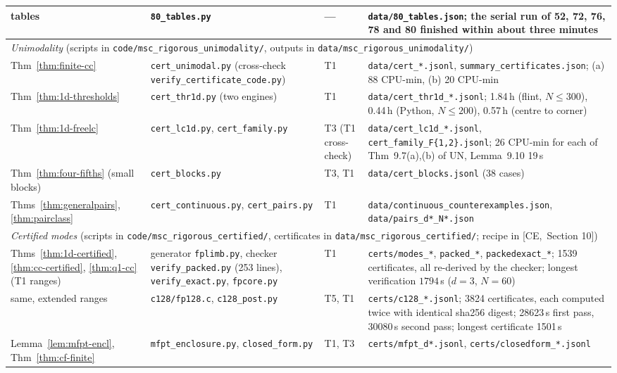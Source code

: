 \documentclass[10pt,a4paper]{article}
\theoremstyle{plain}
\theoremstyle{definition}
\newcommand{\src}[2]{[\textsf{#1},~#2]}           %
\newcommand{\UNI}{\textsf{UN}}
\newcommand{\CER}{\textsf{CE}}
\begin{document}
\begin{center}
\begin{longtable}{p{}p{}p{}p{}}
tables & \texttt{80\_tables.py} & --- & \texttt{data/80\_tables.json}; the serial run of 52, 72, 76, 78 and 80 finished within about three minutes\\
\midrule
\multicolumn{4}{p{0.9\textwidth}}{\emph{Unimodality} (scripts in \texttt{code/msc\_rigorous\_unimodality/}, outputs in \texttt{data/msc\_rigorous\_unimodality/})}\\
Thm~\ref{thm:finite-cc} & \texttt{cert\_unimodal.py} (cross-check \texttt{verify\_certificate\_code.py}) & T1 & \texttt{data/cert\_*.jsonl}, \texttt{summary\_certificates.json}; (a) 88 CPU-min, (b) 20 CPU-min\\
Thm~\ref{thm:1d-thresholds} & \texttt{cert\_thr1d.py} (two engines) & T1 & \texttt{data/cert\_thr1d\_*.jsonl}; 1.84\,h (flint, $N\le300$), 0.44\,h (Python, $N\le200$), 0.57\,h (centre to corner)\\
Thm~\ref{thm:1d-freelc} & \texttt{cert\_lc1d.py}, \texttt{cert\_family.py} & T3 (T1 cross-check) & \texttt{data/cert\_lc1d\_*.jsonl}, \texttt{cert\_family\_F\{1,2\}.jsonl}; 26 CPU-min for each of Thm~9.7(a),(b) of \UNI, Lemma~9.10 19\,s\\
Thm~\ref{thm:four-fifths} (small blocks) & \texttt{cert\_blocks.py} & T3, T1 & \texttt{data/cert\_blocks.jsonl} (38 cases)\\
Thms~\ref{thm:generalpairs}, \ref{thm:pairclass} & \texttt{cert\_continuous.py}, \texttt{cert\_pairs.py} & T1 & \texttt{data/continuous\_counterexamples.json}, \texttt{data/pairs\_d*\_N*.json}\\
\midrule
\multicolumn{4}{p{0.9\textwidth}}{\emph{Certified modes} (scripts in \texttt{code/msc\_rigorous\_certified/}, certificates in \texttt{data/msc\_rigorous\_certified/}; recipe in \src{\CER}{Section 10})}\\
Thms~\ref{thm:1d-certified}, \ref{thm:cc-certified}, \ref{thm:q1-cc} (T1 ranges) & generator \texttt{fplimb.py}, checker \texttt{verify\_packed.py} (253 lines), \texttt{verify\_exact.py}, \texttt{fpcore.py} & T1 & \texttt{certs/modes\_*}, \texttt{packed\_*}, \texttt{packedexact\_*}; 1539 certificates, all re-derived by the checker; longest verification $1794$\,s ($d=3$, $N=60$)\\
same, extended ranges & \texttt{c128/fp128.c}, \texttt{c128\_post.py} & T5, T1 & \texttt{certs/c128\_*.jsonl}; 3824 certificates, each computed twice with identical sha256 digest; 28623\,s first pass, 30080\,s second pass; longest certificate 1501\,s\\
Lemma~\ref{lem:mfpt-encl}, Thm~\ref{thm:cf-finite} & \texttt{mfpt\_enclosure.py}, \texttt{closed\_form.py} & T1, T3 & \texttt{certs/mfpt\_d*.jsonl}, \texttt{certs/closedform\_*.jsonl}\\

\end{longtable}
\end{center}
\end{document}
